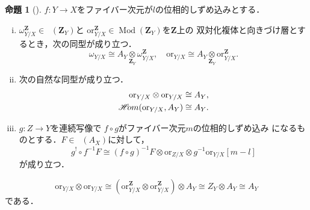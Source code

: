 \documentclass[uplatex,dvipdfmx,a4paper,10pt,draft]{jsarticle}
\theoremstyle{definition}
\newcommand{\zz}{\mathbf{Z}}
\newcommand{\Mod}{\mathop{\mathrm{Mod}}\nolimits}
\numberwithin{equation}{section}
\newcommand{\Dompl}{\mathop{\mathsf{D}^\mathrm{+}}\nolimits}
\newcommand{\HOM}{\mathop{\mathscr{H}\hspace{-2pt}om}\nolimits}%
\newcommand{\ori}{\mathord{\mathrm{or}}}
\theoremstyle{mystyle}
\newtheorem{myprp}[mythm]{命題}
\newenvironment{prp}{\begin{prpbox}\begin{myprp}}{\end{myprp}\end{prpbox}}
\begin{document}
\begin{prp}[{\cite[命題3.3.4]{KS90}}]
    \(f\colon Y\to X\)をファイバー次元が\(l\)の位相的しずめ込みとする．
    \begin{enumerate}[(i)]
        \item \(\omega_{Y/X}^\zz\in\Dompl(\zz_Y)\)と
        \(\ori_{Y/X}^\zz\in\Mod(\zz_Y)\)を\(\zz\)上の
        双対化複体と向きづけ層とするとき，次の同型が成り立つ．\[
            \omega_{Y/X}\cong A_Y
            \mathop{\otimes}\limits_{\zz_Y}
            \omega_{Y/X}^\zz, 
            \quad
            \ori_{Y/X}\cong A_Y
            \mathop{\otimes}\limits_{\zz_Y}
            \ori_{Y/X}^\zz. 
        \]
        \item 次の自然な同型が成り立つ．
        \begin{align*}
                \ori_{Y/X}\otimes \ori_{Y/X}\cong A_Y,\\
                \HOM(\ori_{Y/X},A_Y)\cong A_Y.
        \end{align*}
        \item \(g\colon Z\to Y\)を連続写像で
        \(f\circ g\)がファイバー次元\(m\)の位相的しずめ込み
        になるものとする．\(F\in\Dompl(A_X)\)に対して，
        \[
            g^{!}\circ f^{-1}F
            \cong
            \left(f\circ g\right)^{-1}F
            \otimes \ori_{Z/X}
            \otimes g^{-1}\ori_{Y/X}[m-l]
        \]が成り立つ．
    \end{enumerate}
\end{prp}


\[
    \ori_{Y/X}\otimes \ori_{Y/X}
    \cong
    \left(\ori_{Y/X}^\zz\otimes \ori_{Y/X}^\zz\right)\otimes A_Y
    \cong Z_Y\otimes A_Y
    \cong A_Y
\]
である．
\end{document}
